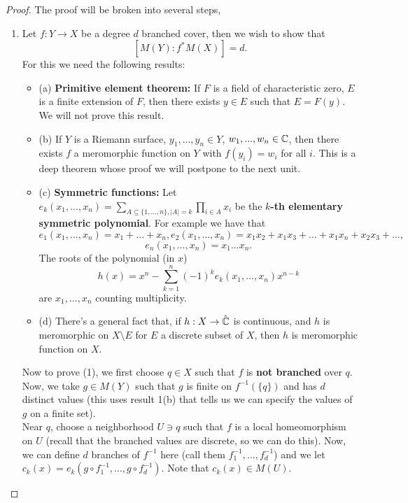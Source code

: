 \documentclass{article}
\begin{document}
{\begin{proof}
    The proof will be broken into several steps,
    \begin{enumerate}
        \item Let $f: Y \to X$ be a degree $d$ branched cover, then we wish to show that
        \[[M(Y):  f^* M(X)] = d.\]
        For this we need the following results:
        \begin{itemize}
            \item (a) \textbf{Primitive element theorem:} If $F$ is a field of characteristic zero, $E$ is a finite extension of $F$, then there exists $y \in E$ such that $E = F(y)$. We will not prove this result.
            \item (b) If $Y$ is a Riemann surface, $y_1, ..., y_n \in Y$, $w_1, ..., w_n \in \mathbb{C}$, then there exists $f$ a meromorphic function on $Y$ with $f(y_i) = w_i$ for all $i$. This is a deep theorem whose proof we will postpone to the next unit.
            \item (c) \textbf{Symmetric functions:} Let $e_k(x_1, ..., x_n) = \sum_{A \subseteq \{1, ..., n\}, |A| = k} \prod_{i \in A} x_i$ be the \textbf{$k$-th elementary symmetric polynomial}. For example we have that
            \[e_1(x_1, ..., x_n) = x_1 + ... + x_n, e_2(x_1, ..., x_n) = x_1 x_2 + x_1 x_3 + ... + x_1 x_n + x_2 x_3 + ..., \]
            \[e_n(x_1, ..., x_n) = x_1 ... x_n.\]
            The roots of the polynomial (in $x$)
            \[h(x) = x^n - \sum_{k=1}^n (-1)^k e_k(x_1, ..., x_n) x^{n-k}\]
            are $x_1, ..., x_n$ counting multiplicity.
            \item (d) There's a general fact that, if $h: X \to \hat{\mathbb{C}}$ is continuous, and $h$ is meromorphic on $X \setminus E$ for $E$ a discrete subset of $X$, then $h$ is meromorphic function on $X$.
        \end{itemize}
        Now to prove (1), we first choose $q \in X$ such that $f$ is \textbf{not branched} over $q$. Now, we take $g \in M(Y)$ such that $g$ is finite on $f^{-1}(\{q\})$ and has $d$ distinct values (this uses result 1(b) that tells us we can specify the values of $g$ on a finite set).\\

        Near $q$, choose a neighborhood $U \ni q$ such that $f$ is a local homeomorphism on $U$ (recall that the branched values are discrete, so we can do this). Now, we can define $d$ branches of $f^{-1}$ here (call them $f_1^{-1}, ..., f_d^{-1}$) and we let $c_k(x) = e_k(g \circ f_1^{-1}, ..., g \circ f^{-1}_d)$. Note that $c_k(x) \in M(U)$.\\


\end{enumerate}
\end{proof}}
\end{document}
